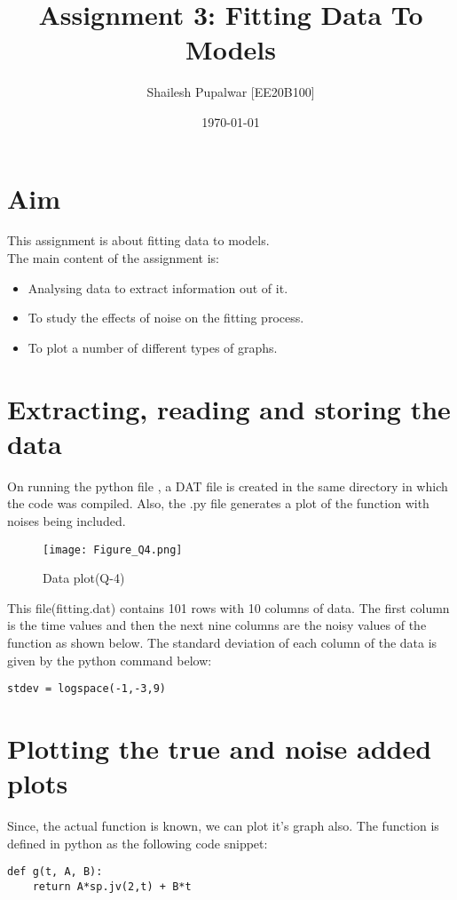 \documentclass[11pt, a4paper]{article}
\title{Assignment 3: Fitting Data To Models} %
\author{Shailesh Pupalwar [EE20B100]} %
\date{\today} %
\begin{document}
	
		
\maketitle %
\section*{Aim}
This assignment is about fitting data to models.\\
The main content of the assignment is: 
\begin{itemize}
\item Analysing data to extract information out of it.
\item To study the effects of noise on the fitting process.
\item To plot a number of different types of graphs. 
\end{itemize}

\section{Extracting, reading and storing the data}
On running the python file \textit{}, a DAT file \textit{} is created in the same directory in which the code was compiled. Also, the .py file generates a plot of the function with noises being included.

   \begin{figure}[!tbh]
   	\centering
   	\texttt{[image: Figure\_Q4.png]}   
   	\caption{Data plot(Q-4)}
   	\label{fig:sample}
   \end{figure} 
   
   This file(fitting.dat) contains 101 rows with 10 columns of data. The first column is the time values and then the next nine columns are the noisy values of the function as shown below. The standard deviation of each column of the data is given by the python command below:
\begin{verbatim}	
stdev = logspace(-1,-3,9)
\end{verbatim}
\section{Plotting the true and noise added plots}
Since, the actual function is known, we can plot it's graph also. The function is defined in python \textit{} as the following code snippet:
\begin{verbatim}	
def g(t, A, B):
    return A*sp.jv(2,t) + B*t
\end{verbatim}
\end{document}
